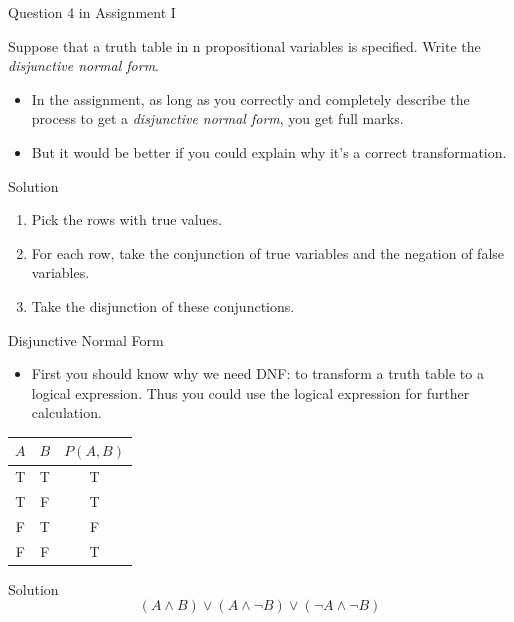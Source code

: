 \begin{frame}{Question 4 in Assignment I}
    \begin{example}
        Suppose that a truth table in n propositional variables is specified. Write the \emph{disjunctive normal form}.
    \end{example}
    \begin{itemize}
        \item In the assignment, as long as you correctly and completely describe the process to get a \emph{disjunctive normal form}, you get full marks.
        \item But it would be better if you could explain why it's a correct transformation.
    \end{itemize}
    \begin{block}{Solution}
        \begin{enumerate}
            \item Pick the rows with true values.
            \item For each row, take the conjunction of true variables and the negation of false variables.
            \item Take the disjunction of these conjunctions.
        \end{enumerate}
    \end{block}
\end{frame}

\begin{frame}{Disjunctive Normal Form}
    \begin{itemize}
        \item First you should know why we need DNF: to transform a truth table to a logical expression. Thus you could use the logical expression for further calculation.
    \end{itemize}
    \begin{example}
        \begin{table}[H]
            \centering
            \begin{tabular}{|c|c|c|}
                $A$ & $B$ & $P(A,B)$\\\hline\hline
                T & T & T \\
                T & F & T \\
                F & T & F \\
                F & F & T
            \end{tabular}
        \end{table}
    \end{example}
    \begin{block}{Solution}
        $$(A\wedge B)\vee(A\wedge\neg B)\vee(\neg A\wedge\neg B)$$
    \end{block}
\end{frame}

